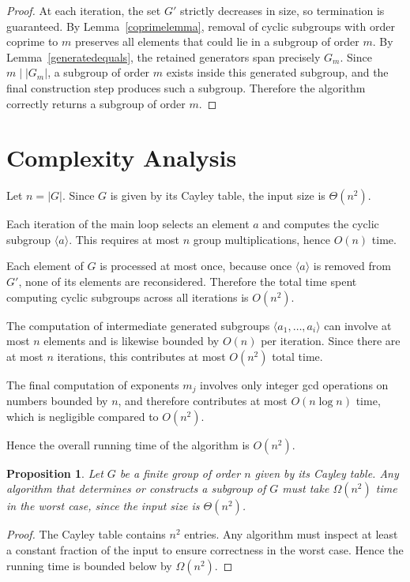 \documentclass[11pt]{article}
\newtheorem{proposition}{Proposition}[section]
\begin{document}
	\begin{proof}
		At each iteration, the set $G'$ strictly decreases in size, so termination is guaranteed. By Lemma~\ref{coprimelemma}, removal of cyclic subgroups with order coprime to $m$ preserves all elements that could lie in a subgroup of order $m$. By Lemma~\ref{generatedequals}, the retained generators span precisely $G_m$. Since $m \mid |G_m|$, a subgroup of order $m$ exists inside this generated subgroup, and the final construction step produces such a subgroup. Therefore the algorithm correctly returns a subgroup of order $m$.
	\end{proof}
	
	\section{Complexity Analysis}
	
	Let $n = |G|$. Since $G$ is given by its Cayley table, the input size is $\Theta(n^2)$.
	
	Each iteration of the main loop selects an element $a$ and computes the cyclic subgroup $\langle a\rangle$. This requires at most $n$ group multiplications, hence $O(n)$ time.
	
	Each element of $G$ is processed at most once, because once $\langle a\rangle$ is removed from $G'$, none of its elements are reconsidered. Therefore the total time spent computing cyclic subgroups across all iterations is $O(n^2)$.
	
	The computation of intermediate generated subgroups $\langle a_1,\dots,a_i\rangle$ can involve at most $n$ elements and is likewise bounded by $O(n)$ per iteration. Since there are at most $n$ iterations, this contributes at most $O(n^2)$ total time.
	
	The final computation of exponents $m_j$ involves only integer gcd operations on numbers bounded by $n$, and therefore contributes at most $O(n \log n)$ time, which is negligible compared to $O(n^2)$.
	
	Hence the overall running time of the algorithm is $O(n^2)$.
	
	\begin{proposition}
		Let $G$ be a finite group of order $n$ given by its Cayley table. Any algorithm that determines or constructs a subgroup of $G$ must take $\Omega(n^2)$ time in the worst case, since the input size is $\Theta(n^2)$.
	\end{proposition}
	
	\begin{proof}
		The Cayley table contains $n^2$ entries. Any algorithm must inspect at least a constant fraction of the input to ensure correctness in the worst case. Hence the running time is bounded below by $\Omega(n^2)$.
	\end{proof}
	
\end{document}
